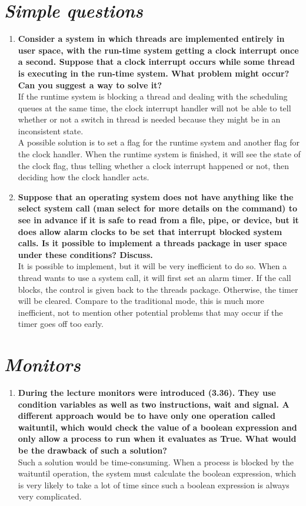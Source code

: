 \documentclass{article}
\begin{document}
\begin{spacing}{1.5}
\section{\textit{Simple questions}}
\begin{enumerate}
	\item\textbf{Consider a system in which threads are implemented entirely in user space, with the run-time system getting a clock interrupt once a second. Suppose that a clock interrupt occurs while some thread is executing in the run-time system. What problem might occur? Can you suggest a way to solve it?}\\
	If the runtime system is blocking a thread and dealing with the scheduling queues at the same time, the clock interrupt handler will not be able to tell whether or not a switch in thread is needed because they might be in an inconsistent state.\\
	A possible solution is to set a flag for the runtime system and another flag for the clock handler. When the runtime system is finished, it will see the state of the clock flag, thus telling whether a clock interrupt happened or not, then deciding how the clock handler acts.
	\item\textbf{Suppose that an operating system does not have anything like the select system call (man select for more details on the command) to see in advance if it is safe to read from a file, pipe, or device, but it does allow alarm clocks to be set that interrupt blocked system calls. Is it possible to implement a threads package in user space under these conditions? Discuss.}\\
	It is possible to implement, but it will be very inefficient to do so. When a thread wants to use a system call, it will first set an alarm timer. If the call blocks, the control is given back to the threads package. Otherwise, the timer will be cleared. Compare to the traditional mode, this is much more inefficient, not to mention other potential problems that may occur if the timer goes off too early.
\end{enumerate}
\section{\textit{Monitors}}
\begin{enumerate}
	\item\textbf{During the lecture monitors were introduced (3.36). They use condition variables as well as two instructions, wait and signal. A different approach would be to have only one operation called waituntil, which would check the value of a boolean expression and only allow a process to run when it evaluates as True. What would be the drawback of such a solution?}\\
	Such a solution would be time-consuming. When a process is blocked by the waituntil operation, the system must calculate the boolean expression, which is very likely to take a lot of time since such a boolean expression is always very complicated.
\end{enumerate}

\end{spacing}
\end{document}
